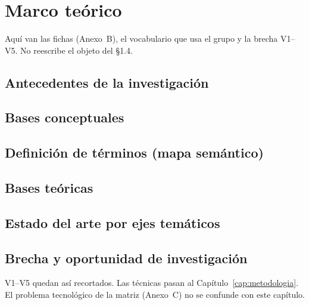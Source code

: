 \chapter{Marco teórico}
\label{cap:marco}

Aquí van las fichas (Anexo~B), el vocabulario que usa el grupo y la brecha V1--V5. No reescribe el
objeto del §1.4.

\section{Antecedentes de la investigación}
\label{sec:antecedentes}


\section{Bases conceptuales}
\label{sec:bases-conceptuales}


\section{Definición de términos (mapa semántico)}
\label{sec:glosario}


\section{Bases teóricas}
\label{sec:bases-teoricas}


\section{Estado del arte por ejes temáticos}
\label{sec:estado-arte}


\section{Brecha y oportunidad de investigación}
\label{sec:brecha}


V1--V5 quedan así recortados. Las técnicas pasan al Capítulo~\ref{cap:metodologia}. El problema
tecnológico de la matriz (Anexo~C) no se confunde con este capítulo.
